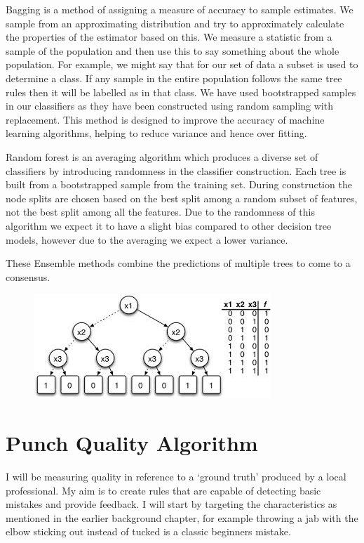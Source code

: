Bagging is a method of assigning a measure of accuracy to sample estimates. We sample from an approximating distribution and try to approximately calculate the
properties of the estimator based on this. We measure a statistic from a sample of the population and then use this to say something about the whole population. For example, we might say that for our set of data a subset is used to determine a class. If any sample in the entire population follows the same tree rules then it will be labelled as in that class. We have used bootstrapped samples in our classifiers as they have been constructed using random sampling with replacement. 
This method is designed to improve the accuracy of machine learning algorithms, helping to reduce variance and hence over fitting. 

Random forest is an averaging algorithm which produces a diverse set of classifiers by introducing randomness in the classifier construction. Each tree is built from a bootstrapped sample from the training set. During construction the node splits are chosen based on the best split among a random subset of features, not the best split among all the features. Due to the randomness of this algorithm we expect it to have a slight bias compared to other decision tree models, however due to the averaging we expect a lower variance.

These Ensemble methods combine the predictions of multiple trees to come to a consensus.


\begin{figure}[h]
    \centering
    \includegraphics[height=0.25\textheight]{fig02/dtree}
    \label{fig:kinect}
\end{figure}


\section{Punch Quality Algorithm}
I will be measuring quality in reference to a `ground truth' produced by a local professional. My aim is to create rules that are capable of detecting basic mistakes and provide feedback. I will start by targeting the characteristics as mentioned in the earlier background chapter, for example 
throwing a jab with the elbow sticking out instead of tucked is a classic beginners mistake.

